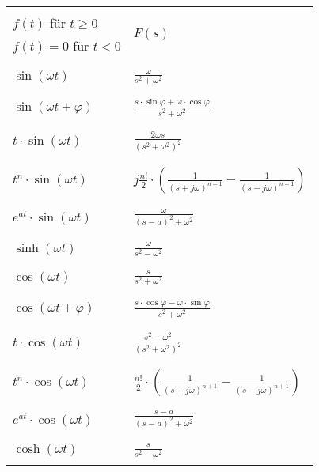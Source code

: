 \begin{tabularx}{\textwidth}{|p{11cm}|X|} 
	\hline
	&\\
	\(f(t)\) für \(t\ge 0\) & \multirow{2}{*}{\(F(s)\)} \\
	\(f(t)=0\) für \(t<0\) & \\
	&\\
	\hline
	\hline
	&\\
	\(\sin\left(\omega t\right)\) & \(\frac{\omega}{s^2+\omega^2}\) \\
	&\\
	\hline
	&\\
	\(\sin\left(\omega t+\varphi\right)\) & \(\frac{s\cdot\sin\varphi+\omega\cdot\cos\varphi}{s^2+\omega^2}\) \\
	&\\
	\hline
	&\\
	\(t\cdot\sin\left(\omega t\right)\) & \(\frac{2\omega s}{\left(s^2+\omega^2\right)^2}\) \\
	&\\
	\hline
	&\\
	\(t^n\cdot\sin\left(\omega t\right)\) & \(j\frac{n!}{2}\cdot\left(\frac{1}{(s+j\omega)^{n+1}}-\frac{1}{(s-j\omega)^{n+1}}\right)\) \\
	&\\
	\hline
	&\\
	\(e^{at}\cdot\sin\left(\omega t\right)\) & \(\frac{\omega}{(s-a)^2+\omega^2}\) \\
	&\\
	\hline
	&\\
	\(\sinh\left(\omega t\right)\) & \(\frac{\omega}{s^2-\omega^2}\) \\
	&\\
	\hline
	&\\
	\(\cos\left(\omega t\right)\) & \(\frac{s}{s^2+\omega^2}\) \\
	&\\
	\hline
	&\\
	\(\cos\left(\omega t+\varphi\right)\) & \(\frac{s\cdot\cos\varphi-\omega\cdot\sin\varphi}{s^2+\omega^2}\) \\
	&\\
	\hline
	&\\
	\(t\cdot\cos\left(\omega t\right)\) & \(\frac{s^2-\omega^2}{\left(s^2+\omega^2\right)^2}\) \\
	&\\
	\hline
	&\\
	\(t^n\cdot\cos\left(\omega t\right)\) & \(\frac{n!}{2}\cdot\left(\frac{1}{(s+j\omega)^{n+1}}-\frac{1}{(s-j\omega)^{n+1}}\right)\) \\
	&\\
	\hline
	&\\
	\(e^{at}\cdot\cos\left(\omega t\right)\) & \(\frac{s-a}{(s-a)^2+\omega^2}\) \\
	&\\
	\hline
	&\\
	\(\cosh\left(\omega t\right)\) & \(\frac{s}{s^2-\omega^2}\) \\
	&\\
	\hline
\end{tabularx}
\newpage

